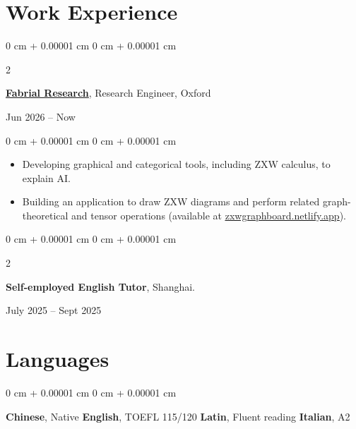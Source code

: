 \documentclass[10pt, a4paper]{article}
\newenvironment{highlights}{
    \begin{itemize}[
        topsep=0.10 cm,
        parsep=0.10 cm,
        partopsep=0pt,
        itemsep=0pt,
        leftmargin=0 cm + 10pt
    ]
}{
    \end{itemize}
} %
\newenvironment{onecolentry}{
    \begin{adjustwidth}{
        0 cm + 0.00001 cm
    }{
        0 cm + 0.00001 cm
    }
}{
    \end{adjustwidth}
} %
\newenvironment{twocolentry}[2][]{
    \onecolentry
    \def\secondColumn{#2}
    \setcolumnwidth{\fill, 4.5 cm}
    \begin{paracol}{2}
}{
    \switchcolumn \raggedleft \secondColumn
    \end{paracol}
    \endonecolentry
} %
\begin{document}
    \section{Work Experience}

        \begin{twocolentry}{
            Jun 2026 – Now
        }
			\href{https://yetin.net}{\textbf{\underline{Fabrial Research}}}, Research Engineer, Oxford
		\end{twocolentry}
        \vspace{0.10 cm}
        \begin{onecolentry}
            \begin{highlights}
			\item Developing graphical and categorical tools, including ZXW calculus, to explain AI.
				\item Building an application to draw ZXW diagrams and perform related graph-theoretical and tensor operations (available at \href{https://zxwgraphboard.netlify.app}{\underline{zxwgraphboard.netlify.app}}).
            \end{highlights}
        \end{onecolentry}

        \vspace{0.10 cm}
        \begin{twocolentry}{
            July 2025 – Sept 2025
        }
		\textbf{Self-employed English Tutor}, Shanghai.
		\end{twocolentry}
    

	\section{Languages}
	\begin{onecolentry}
		\textbf{Chinese}, Native
		\textbullet{} 
		\textbf{English}, TOEFL 115/120 
		\textbullet{} 
		\textbf{Latin}, Fluent reading
		\textbullet{} 
		\textbf{Italian}, A2
	\end{onecolentry}
\end{document}
